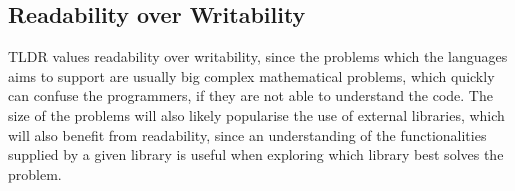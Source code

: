 \subsection{Readability over Writability}

TLDR values readability over writability, since the problems which the languages aims to support are usually big complex mathematical problems, which quickly can confuse the programmers, if they are not able to understand the code. The size of the problems will also likely popularise the use of external libraries, which will also benefit from readability, since an understanding of the functionalities supplied by a given library is useful when exploring which library best solves the problem.

